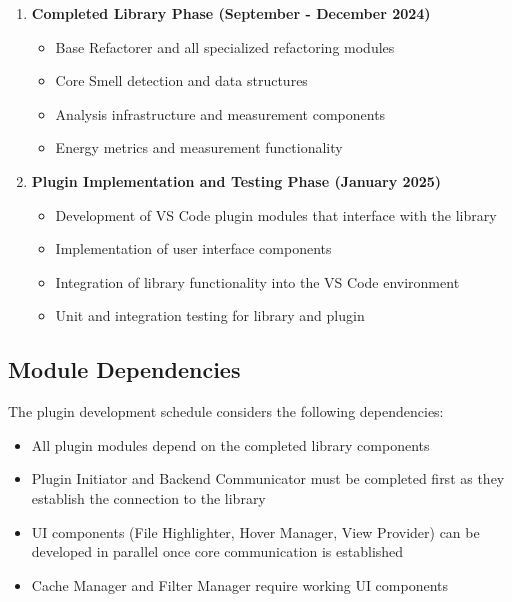 \documentclass[12pt, titlepage]{article}
\begin{document}
\begin{enumerate}
    \item \textbf{Completed Library Phase (September - December 2024)}
    \begin{itemize}
        \item Base Refactorer and all specialized refactoring modules
        \item Core Smell detection and data structures
        \item Analysis infrastructure and measurement components
        \item Energy metrics and measurement functionality
    \end{itemize}

    \item \textbf{Plugin Implementation and Testing Phase (January 2025)}
    \begin{itemize}
        \item Development of VS Code plugin modules that interface with the library
        \item Implementation of user interface components
        \item Integration of library functionality into the VS Code environment
        \item Unit and integration testing for library and plugin
    \end{itemize}
\end{enumerate}

\subsection{Module Dependencies}

The plugin development schedule considers the following dependencies:

\begin{itemize}
    \item All plugin modules depend on the completed library components
    \item Plugin Initiator and Backend Communicator must be completed first as they establish the connection to the library
    \item UI components (File Highlighter, Hover Manager, View Provider) can be developed in parallel once core communication is established
    \item Cache Manager and Filter Manager require working UI components
\end{itemize}
\end{document}
